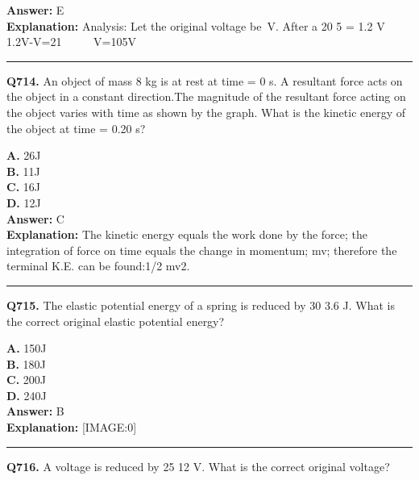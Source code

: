\documentclass[12pt]{article}
\begin{document}
\textbf{Answer:} E \\
\textbf{Explanation:} Analysis:
Let the original voltage be V. After a 20%
5
=
1.2
V
1.2V-V=21      V=105V

\hrule
\vspace{1em}


\noindent
\textbf{Q714.} An object of mass 8 kg is at rest at time = 0 s. A resultant force acts on the object in a constant direction.The magnitude of the resultant force acting on the object varies with time as shown by the graph.
What is the kinetic energy of the object at time = 0.20 s?



\textbf{A.} 26J \\
\textbf{B.} 11J \\
\textbf{C.} 16J \\
\textbf{D.} 12J \\

\textbf{Answer:} C \\
\textbf{Explanation:} The kinetic energy equals the work done by the force; the integration of force on time equals the change in momentum; mv; therefore the terminal K.E. can be found:1/2 mv2.

\hrule
\vspace{1em}


\noindent
\textbf{Q715.} The elastic potential energy of a spring is reduced by 30%
3.6
J. What is the correct original elastic potential energy?



\textbf{A.} 150J \\
\textbf{B.} 180J \\
\textbf{C.} 200J \\
\textbf{D.} 240J \\

\textbf{Answer:} B \\
\textbf{Explanation:} [IMAGE:0]

\hrule
\vspace{1em}


\noindent
\textbf{Q716.} A voltage is reduced by 25%
12
V. What is the correct original voltage?
\end{document}
